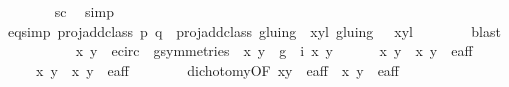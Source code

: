 \begin{isabellebody}
\ \ \ \ \ \ \isamarkupfalse%
\ sc\ \isamarkupfalse%
\ simp\isanewline
\ \ \ \ \isamarkupfalse%
\ \isamarkupfalse%
\ eq{\isacharunderscore}simp{\isacharcolon}\ {\isachardoublequoteopen}proj{\isacharunderscore}add{\isacharunderscore}class\ p\ q\ {\isacharequal}\ proj{\isacharunderscore}add{\isacharunderscore}class\ {\isacharparenleft}gluing\ {\isacharbackquote}{\isacharbackquote}\ {\isacharbraceleft}{\isacharparenleft}{\isacharparenleft}x{\isacharcomma}y{\isacharparenright}{\isacharcomma}l{\isacharparenright}{\isacharbraceright}{\isacharparenright}\ {\isacharparenleft}gluing\ {\isacharbackquote}{\isacharbackquote}\ {\isacharbraceleft}{\isacharparenleft}{\isasymtau}\ {\isacharparenleft}x{\isacharprime}{\isacharcomma}y{\isacharprime}{\isacharparenright}{\isacharcomma}l{\isacharprime}{\isacharplus}{}{\isacharparenright}{\isacharbraceright}{\isacharparenright}{\isachardoublequoteclose}\isanewline
\ \ \ \ \ \ \isamarkupfalse%
\ blast\isanewline
\isanewline
\ \ \ \ \isamarkupfalse%
\isanewline
\ \ \ \ \ \ {\isachardoublequoteopen}{\isacharparenleft}x{\isacharcomma}\ y{\isacharparenright}\ {\isasymin}\ e{\isacharunderscore}circ\ {\isasymand}\ {\isacharparenleft}{\isasymexists}g{\isasymin}symmetries{\isachardot}\ {\isasymtau}\ {\isacharparenleft}x{\isacharprime}{\isacharcomma}\ y{\isacharprime}{\isacharparenright}\ {\isacharequal}\ {\isacharparenleft}g\ {\isasymcirc}\ i{\isacharparenright}\ {\isacharparenleft}x{\isacharcomma}\ y{\isacharparenright}{\isacharparenright}{\isachardoublequoteclose}\ \isanewline
\ \ \ \ {\isacharbar}\ {\isachardoublequoteopen}{\isacharparenleft}{\isacharparenleft}x{\isacharcomma}\ y{\isacharparenright}{\isacharcomma}\ {\isasymtau}\ {\isacharparenleft}x{\isacharprime}{\isacharcomma}\ y{\isacharprime}{\isacharparenright}{\isacharparenright}\ {\isasymin}\ e{\isacharunderscore}aff{\isacharunderscore}{}{\isachardoublequoteclose}\ \isanewline
\ \ \ \ {\isacharbar}\ {\isachardoublequoteopen}{\isacharparenleft}{\isacharparenleft}x{\isacharcomma}\ y{\isacharparenright}{\isacharcomma}\ {\isasymtau}\ {\isacharparenleft}x{\isacharprime}{\isacharcomma}\ y{\isacharprime}{\isacharparenright}{\isacharparenright}\ {\isasymin}\ e{\isacharunderscore}aff{\isacharunderscore}{}{\isachardoublequoteclose}\isanewline
\ \ \ \ \ \ \isamarkupfalse%
\ dichotomy{\isacharunderscore}{}{\isacharbrackleft}OF\ {\isacartoucheopen}{\isacharparenleft}x{\isacharcomma}y{\isacharparenright}\ {\isasymin}\ e{\isacharunderscore}aff{\isacartoucheclose}\ {\isacartoucheopen}{\isasymtau}\ {\isacharparenleft}x{\isacharprime}{\isacharcomma}\ y{\isacharprime}{\isacharparenright}\ {\isasymin}\ e{\isacharunderscore}aff{\isacartoucheclose}{\isacharbrackright}\ \isamarkupfalse%

\end{isabellebody}
